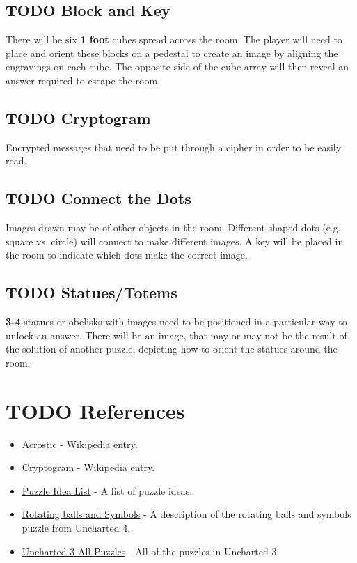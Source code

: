 \documentclass[11pt]{article}
\begin{document}
\subsection{{\bfseries\sffamily TODO} Block and Key}
\label{sec:orgd2bf218}
There will be six \textbf{1 foot} cubes spread across the room. The player will need to place and orient these blocks on a pedestal to create an image by aligning the engravings on each cube. The opposite side of the cube array will then reveal an answer required to escape the room.

\subsection{{\bfseries\sffamily TODO} Cryptogram}
\label{sec:org06474f3}
Encrypted messages that need to be put through a cipher in order to be easily read.

\subsection{{\bfseries\sffamily TODO} Connect the Dots}
\label{sec:orgb7769f9}
Images drawn may be of other objects in the room. Different shaped dots (e.g. square vs. circle) will connect to make different images. A key will be placed in the room to indicate which dots make the correct image.

\subsection{{\bfseries\sffamily TODO} Statues/Totems}
\label{sec:org62881ca}
\textbf{3-4} statues or obelisks with images need to be positioned in a particular way to unlock an answer. There will be an image, that may or may not be the result of the solution of another puzzle, depicting how to orient the statues around the room.

\section{{\bfseries\sffamily TODO} References}
\label{sec:org52d4fa0}
\begin{itemize}
\item \href{https://en.wikipedia.org/wiki/Acrostic\_(puzzle)}{Acrostic} - Wikipedia entry.
\item \href{https://en.wikipedia.org/wiki/Cryptogram}{Cryptogram} - Wikipedia entry.
\item \href{http://www.bloodandbones.com/ph12sim/types.htm}{Puzzle Idea List} - A list of puzzle ideas.
\item \href{http://www.accelerated-ideas.com/news/uncharted-4-chapter-1-2-puzzle-solution-rotating-balls.aspx}{Rotating balls and Symbols} - A description of the rotating balls and symbols puzzle from Uncharted 4.
\item \href{http://www.gameshampoo.com/magazine/articles/24/uncharted-3-all-puzzle-solutions.html}{Uncharted 3 All Puzzles} - All of the puzzles in Uncharted 3.
\end{itemize}
\end{document}
